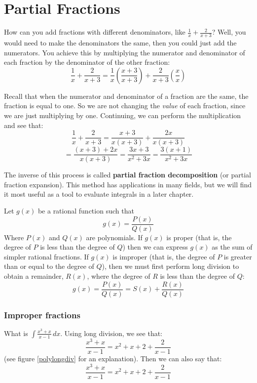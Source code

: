 \chapter{Partial Fractions}

How can you add fractions with different denominators, like $\frac{1}{x} + \frac{2}{x + 3}$? Well, you would need to make the denominators the same, then you could just add the numerators. You achieve this by multiplying the numerator and denominator of each fraction by the denominator of the other fraction:
$$\frac{1}{x} + \frac{2}{x + 3} = \frac{1}{x} \left( \frac{x + 3}{x + 3} \right) + \frac{2}{x + 3} \left( \frac{x}{x} \right)$$

Recall that when the numerator and denominator of a fraction are the same, the fraction is equal to one. So we are not changing the \textit{value} of each fraction, since we are just multiplying by one. Continuing, we can perform the multiplication and see that:
$$\frac{1}{x} + \frac{2}{x + 3} = \frac{x + 3}{x(x + 3)} + \frac{2x}{x(x + 3)}$$
$$= \frac{(x + 3) + 2x}{x(x + 3)} = \frac{3x + 3}{x^2 + 3x} = \frac{3(x + 1)}{x^2 + 3x}$$

The inverse of this process is called \textbf{partial fraction decomposition} (or partial fraction expansion). This method has applications in many fields, but we will find it most useful as a tool to evaluate integrals in a later chapter. 


Let $g(x)$ be a rational function such that 
$$g(x) = \frac{P(x)}{Q(x)}$$
Where $P(x)$ and $Q(x)$ are polynomials. If $g(x)$ is proper (that is, the degree of $P$ is less than the degree of $Q$) then we can express $g(x)$ as the sum of simpler rational fractions. If $g(x)$ is improper (that is, the degree of $P$ is greater than or equal to the degree of $Q$), then we must first perform long division to obtain a remainder, $R(x)$, where the degree of $R$ is less than the degree of $Q$:
$$g(x) = \frac{P(x)}{Q(x)} = S(x) + \frac{R(x)}{Q(x)}$$

\subsection{Improper fractions}
What is $\int \frac{x^3 + x}{x-1}\,dx$. Using long division, we see that:
$$\frac{x^3 + x}{x - 1} = x^2 + x + 2 + \frac{2}{x - 1}$$
(see figure \ref{polylongdiv} for an explanation). Then we can also say that:
$$\frac{x^3 + x}{x-1} = x^2 + x + 2 + \frac{2}{x-1}$$


